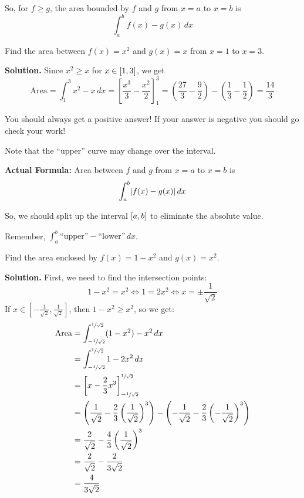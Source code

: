 So, for $ f\geqslant g $, the area bounded by $ f $ and $ g $ from
$ x=a $ to $ x=b $ is
\[ \int_{a}^{b} f(x)-g(x)\, d{x} \]

\begin{Example}{}{}
    Find the area between $ f(x)=x^2 $ and $ g(x)=x $ from $ x=1 $ to $ x=3 $.

    \textbf{Solution.} Since $ x^2\geqslant x $ for $ x\in\interval{1}{3} $, we get
    \[ \text{Area}=\int_{1}^{3} x^2-x\, d{x} =
        \left[ \frac{x^3}{3} -\frac{x^2}{2} \right]_1^3
        =\left( \frac{27}{3} -\frac{9}{2}  \right)-\left( \frac{1}{3}-\frac{1}{2}  \right)
        =\frac{14}{3} \]
\end{Example}

You should always get a positive answer! If your answer is negative you should go check
your work!

Note that the ``upper'' curve may change over the interval.

\textbf{Actual Formula:} Area between $ f $ and $ g $ from $ x=a $ to $ x=b $ is
\[ \int_{a}^{b} \lvert f(x)-g(x)\rvert\, d{x}  \]

So, we should split up the interval $ \interval{a}{b} $ to eliminate
the absolute value.

Remember, $ \int_{a}^{b} \text{``upper''}-\text{``lower''}\, d{x} $.

\begin{Example}{}{}
    Find the area enclosed by $ f(x)=1-x^2 $ and $ g(x)=x^2 $.

    \textbf{Solution.} First, we need to find the intersection points:
    \[ 1-x^2=x^2\iff 1=2x^2\iff x=\pm \frac{1}{\sqrt{2}} \]
    If $ x\in\left[ -\frac{1}{\sqrt{2}},\frac{1}{\sqrt{2}} \right] $, then $ 1-x^2\geqslant x^2 $,
    so we get:
    \begin{align*}
        \text{Area} & =
        \int_{-\sfrac{1}{\sqrt{2}}}^{\sfrac{1}{\sqrt{2}}}(1-x^2)-x^2 \, d{x}                                \\
                    & =\int_{-\sfrac{1}{\sqrt{2}}}^{\sfrac{1}{\sqrt{2}}}1-2x^2 \, d{x}                      \\
                    & =\left[ x-\frac{2}{3} x^3 \right]_{-\sfrac{1}{\sqrt{2}}}^{\sfrac{1}{\sqrt{2}}}        \\
                    & =\left( \frac{1}{\sqrt{2}}-\frac{2}{3} \left( \frac{1}{\sqrt{2}}  \right)^3  \right)-
        \left( -\frac{1}{\sqrt{2}}-\frac{2}{3} \left( -\frac{1}{\sqrt{2}}  \right)^3  \right)               \\
                    & =\frac{2}{\sqrt{2}}-\frac{4}{3} \left( \frac{1}{\sqrt{2}}  \right)^3                  \\
                    & =\frac{2}{\sqrt{2}}-\frac{2}{3\sqrt{2}}                                               \\
                    & =\frac{4}{3\sqrt{2}}
    \end{align*}
\end{Example}

